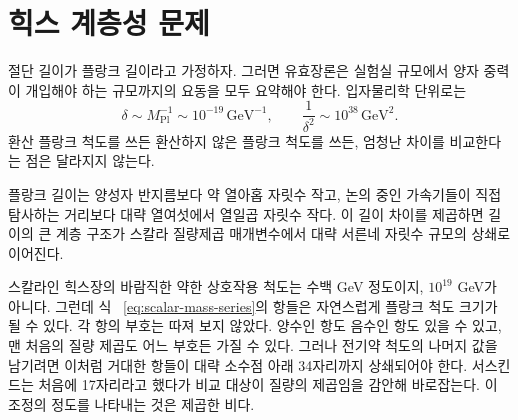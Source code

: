 \begin{classroomqa}
\end{classroomqa}

\section{힉스 계층성 문제}

절단 길이가 플랑크 길이라고 가정하자. 그러면 유효장론은 실험실 규모에서 양자 중력이 개입해야 하는 규모까지의 요동을 모두 요약해야 한다. 입자물리학 단위로는
\begin{equation}
\delta\sim M_{\mathrm{Pl}}^{-1}\sim10^{-19}\,\mathrm{GeV}^{-1},
\qquad
\frac{1}{\delta^2}\sim10^{38}\,\mathrm{GeV}^2.
\label{eq:planck-cutoff}
\end{equation}
환산 플랑크 척도를 쓰든 환산하지 않은 플랑크 척도를 쓰든, 엄청난 차이를 비교한다는 점은 달라지지 않는다.

플랑크 길이는 양성자 반지름보다 약 열아홉 자릿수 작고, 논의 중인 가속기들이 직접 탐사하는 거리보다 대략 열여섯에서 열일곱 자릿수 작다. 이 길이 차이를 제곱하면 길이의 큰 계층 구조가 스칼라 질량제곱 매개변수에서 대략 서른네 자릿수 규모의 상쇄로 이어진다.

스칼라인 힉스장의 바람직한 약한 상호작용 척도는 수백 GeV 정도이지, \(10^{19}\) GeV가 아니다. 그런데 식 ~\eqref{eq:scalar-mass-series}의 항들은 자연스럽게 플랑크 척도 크기가 될 수 있다. 각 항의 부호는 따져 보지 않았다. 양수인 항도 음수인 항도 있을 수 있고, 맨 처음의 질량 제곱도 어느 부호든 가질 수 있다. 그러나 전기약 척도의 나머지 값을 남기려면 이처럼 거대한 항들이 대략 소수점 아래 34자리까지 상쇄되어야 한다. 서스킨드는 처음에 17자리라고 했다가 비교 대상이 질량의 제곱임을 감안해 바로잡는다. 이 조정의 정도를 나타내는 것은 제곱한 비다.

\begin{classroomqa}
\end{classroomqa}

